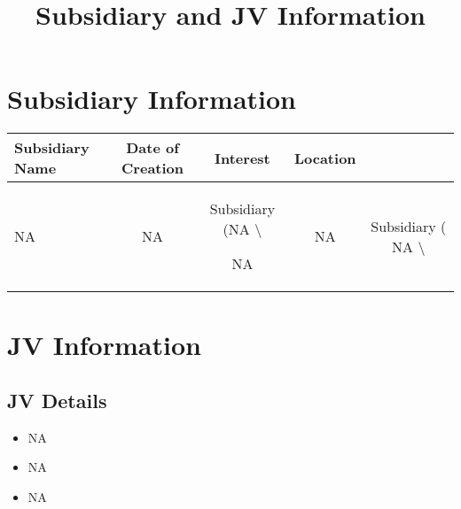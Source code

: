 \documentclass{article}
\begin{document}
\title{\textbf{Subsidiary and JV Information}}
\date{}
\maketitle

\section*{Subsidiary Information}
\begin{tabularx}{\textwidth}{|X|c|c|c|c|}
    \hline
    \rowcolor{blue!20}
    \textbf{Subsidiary Name} & \textbf{Date of Creation} & \textbf{Interest} & \textbf{Location} \\
    \hline
    
    NA & NA & Subsidiary (NA \textbackslash{}%
    \hline
    
    NA & NA & Subsidiary ( NA \textbackslash{}%
    \hline
    
\end{tabularx}

\section*{JV Information}
\begin{tcolorbox}[colback=white]
\subsection*{JV Details}
\begin{itemize}
    \renewcommand\labelitemi{--}
    
    \item NA
    
    \item NA
    
    \item NA
    
\end{itemize}
\end{tcolorbox}
\end{document}
